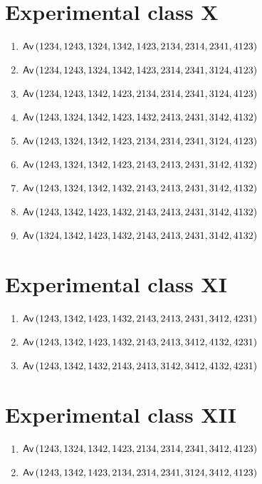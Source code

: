 \section{Experimental class X}
\begin{enumerate}
\item $\textsf{Av}\left(1234,1243,1324,1342,1423,2134,2314,2341,4123\right)$
\item $\textsf{Av}\left(1234,1243,1324,1342,1423,2314,2341,3124,4123\right)$
\item $\textsf{Av}\left(1234,1243,1342,1423,2134,2314,2341,3124,4123\right)$
\item $\textsf{Av}\left(1243,1324,1342,1423,1432,2413,2431,3142,4132\right)$
\item $\textsf{Av}\left(1243,1324,1342,1423,2134,2314,2341,3124,4123\right)$
\item $\textsf{Av}\left(1243,1324,1342,1423,2143,2413,2431,3142,4132\right)$
\item $\textsf{Av}\left(1243,1324,1342,1432,2143,2413,2431,3142,4132\right)$
\item $\textsf{Av}\left(1243,1342,1423,1432,2143,2413,2431,3142,4132\right)$
\item $\textsf{Av}\left(1324,1342,1423,1432,2143,2413,2431,3142,4132\right)$
\end{enumerate}

\section{Experimental class XI}
\begin{enumerate}
\item $\textsf{Av}\left(1243,1342,1423,1432,2143,2413,2431,3412,4231\right)$
\item $\textsf{Av}\left(1243,1342,1423,1432,2143,2413,3412,4132,4231\right)$
\item $\textsf{Av}\left(1243,1342,1432,2143,2413,3142,3412,4132,4231\right)$
\end{enumerate}

\section{Experimental class XII}
\begin{enumerate}
\item $\textsf{Av}\left(1243,1324,1342,1423,2134,2314,2341,3412,4123\right)$
\item $\textsf{Av}\left(1243,1342,1423,2134,2314,2341,3124,3412,4123\right)$
\end{enumerate}

